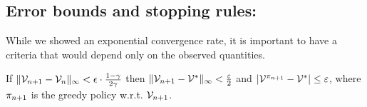 \subsection{Error bounds and stopping rules:}

While we showed an exponential convergence rate, it is important to
have a criteria that would depend only on the observed quantities.
\begin{lemma}
 If $\|\mathcal{V}_{n+1}-\mathcal{V}_{n}\|_\infty < \epsilon \cdot \frac{1-\gamma}{2\gamma}$ then $\|\mathcal{V}_{n+1} -
\mathcal{V}^{*}\|_\infty < \frac{\varepsilon}{2}$ and
$|\mathcal{V}^{\pi_{n+1}}-\mathcal{V}^*|\leq \varepsilon$, where
$\pi_{n+1}$ is the greedy policy w.r.t. $\mathcal{V}_{n+1}$.
\end{lemma}
